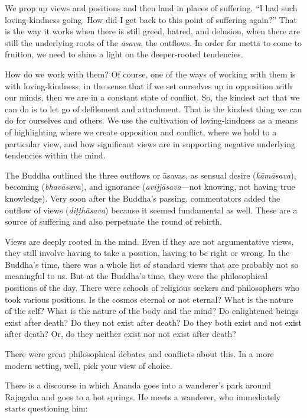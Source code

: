 We prop up views and positions and then land in places of suffering. “I
had such loving-kindness going. How did I get back to this point of
suffering again?” That is the way it works when there is still greed,
hatred, and delusion, when there are still the underlying roots of the
\emph{āsava}, the outflows. In order for mettā to come to fruition, we
need to shine a light on the deeper-rooted tendencies.

How do we work with them? Of course, one of the ways of working with
them is with loving-kindness, in the sense that if we set ourselves up
in opposition with our minds, then we are in a constant state of
conflict. So, the kindest act that we can do is to let go of defilement
and attachment. That is the kindest thing we can do for ourselves and
others. We use the cultivation of loving-kindness as a means of
highlighting where we create opposition and conflict, where we hold to a
particular view, and how significant views are in supporting negative
underlying tendencies within the mind.

The Buddha outlined the three outflows or āsavas, as sensual desire
(\emph{kāmāsava}), becoming (\emph{bhavāsava}), and ignorance
(\emph{avijjāsava}—not knowing, not having true knowledge). Very soon
after the Buddha’s passing, commentators added the outflow of views
(\emph{diṭṭhāsava}) because it seemed fundamental as well. These are a
source of suffering and also perpetuate the round of rebirth.

Views are deeply rooted in the mind. Even if they are not argumentative
views, they still involve having to take a position, having to be right
or wrong. In the Buddha’s time, there was a whole list of standard views
that are probably not so meaningful to us. But at the Buddha’s time,
they were the philosophical positions of the day. There were schools of
religious seekers and philosophers who took various positions. Is the
cosmos eternal or not eternal? What is the nature of the self? What is
the nature of the body and the mind? Do enlightened beings exist after
death? Do they not exist after death? Do they both exist and not exist
after death? Or, do they neither exist nor not exist after death?

There were great philosophical debates and conflicts about this. In a
more modern setting, well, pick your view of choice.

There is a discourse in which Ānanda goes into a wanderer’s park around
Rajagaha and goes to a hot springs. He meets a wanderer, who immediately
starts questioning him:

